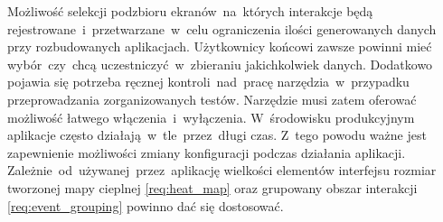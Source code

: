 \begin{enumerate}[label=\textbf{F.\arabic*}]
	 Możliwość selekcji podzbioru ekranów~na~których interakcje będą rejestrowane~i~przetwarzane~w~celu ograniczenia ilości generowanych danych przy rozbudowanych aplikacjach.
	 Użytkownicy końcowi zawsze powinni mieć wybór~czy~chcą uczestniczyć~w~zbieraniu jakichkolwiek danych. Dodatkowo pojawia się potrzeba ręcznej kontroli~nad~pracę narzędzia~w~przypadku przeprowadzania zorganizowanych testów. Narzędzie musi zatem oferować możliwość łatwego włączenia~i~wyłączenia.
	 W~środowisku produkcyjnym aplikacje często działają~w~tle~przez~długi czas. Z~tego powodu ważne jest zapewnienie możliwości zmiany konfiguracji podczas działania aplikacji.
	 Zależnie~od~używanej~przez~aplikację wielkości elementów interfejsu rozmiar tworzonej mapy cieplnej \ref{req:heat_map} oraz grupowany obszar interakcji \ref{req:event_grouping} powinno dać się dostosować. 
\end{enumerate}

